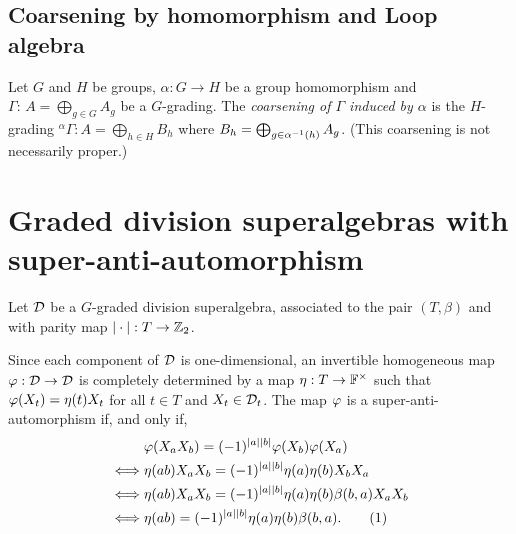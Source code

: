 \documentclass{amsbook}
\newcommand\numberthis{\addtocounter{equation}{1}\tag{\theequation}}
\begin{document}






\section{Coarsening by homomorphism and Loop algebra}

\begin{defi}
	Let $G$ and $H$ be groups, $\alpha:G\to H$ be a group homomorphism and $\Gamma:\,A=\bigoplus_{g\in G} A_g$ be a $G$-grading. The \emph{coarsening of $\Gamma$ induced by $\alpha$} is the $H$-grading ${}^\alpha \Gamma: A= \bigoplus_{h\in H} B_h$ where
	$ B_h = \bigoplus_{g\in \alpha^{-1} (h)} A_g$. (This coarsening is not necessarily proper.)
\end{defi}


\chapter{Graded division superalgebras with super-anti-automorphism}


Let $\mathcal{D}$ be a $G$-graded division superalgebra, associated to the pair $(T, \beta)$ and with parity map $| \cdot |: T \to \mathbb{Z}_2$.

Since each component of $\mathcal{D}$ is one-dimensional, an invertible homogeneous map $\varphi: \mathcal{D} \to \mathcal{D}$ is completely determined by a map $\eta: T \to \mathbb{F}^\times$ such that $\varphi(X_t) = \eta(t) X_t$ for all $t\in T$ and $X_t\in \mathcal{D}_t$. The map $\varphi$ is a super-anti-automorphism if, and only if,
%
\begin{align*}
    &\vphi(X_a X_b) = (-1)^{|a||b|} \vphi(X_b) \vphi(X_a)\\ \iff& \eta(ab)X_a X_b = (-1)^{|a||b|} \eta(a) \eta(b) X_b X_a\\ \iff& \eta(ab)X_a X_b = (-1)^{|a||b|} \eta(a) \eta(b) \beta(b,a) X_a X_b\\ \iff& \eta(ab) = (-1)^{|a||b|} \eta(a) \eta(b) \beta(b,a). \numberthis \label{eq:eta-super-anti-auto}
\end{align*}
\end{document}
